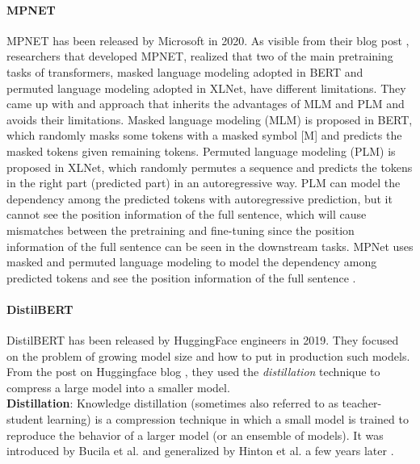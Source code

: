 \documentclass[\main/main.tex]{subfiles}
\begin{document}
\paragraph{MPNET}
MPNET has been released by Microsoft in 2020. As visible from their blog post \cite{mpnet_blog_post},  researchers that developed MPNET, realized that two of the main pretraining tasks of transformers, masked language modeling adopted in BERT and permuted language modeling adopted in XLNet, have different limitations. They came up with and approach that inherits the advantages of MLM and PLM and avoids their limitations. Masked language modeling (MLM) is proposed in BERT, which randomly masks some tokens with a masked symbol [M] and predicts the masked tokens given remaining tokens. Permuted language modeling (PLM) is proposed in XLNet, which randomly permutes a sequence and predicts the tokens in the right part (predicted part) in an autoregressive way. PLM can model the dependency among the predicted tokens with autoregressive prediction, but it cannot see the position information of the full sentence, which will cause mismatches between the pretraining and fine-tuning since the position information of the full sentence can be seen in the downstream tasks. MPNet uses masked and permuted language modeling to model the dependency among predicted tokens and see the position information of the full sentence \cite{DBLP:journals/corr/abs-2004-09297}.
\paragraph{DistilBERT}
DistilBERT has been released by HuggingFace engineers in 2019. They focused on the problem of growing model size and how to put in production such models. From the post on Huggingface blog \cite{distilbert_blog_post}, they used the \emph{distillation} technique to compress a large model into a smaller model.\\
\textbf{Distillation}: Knowledge distillation (sometimes also referred to as teacher-student learning) is a compression technique in which a small model is trained to reproduce the behavior of a larger model (or an ensemble of models). It was introduced by Bucila et al. \cite{10.1145/1150402.1150464} and generalized by Hinton et al. \cite{hinton2015distilling} a few years later \cite{DBLP:journals/corr/abs-1910-01108}.
\end{document}
